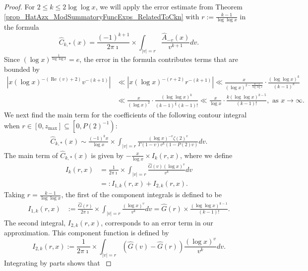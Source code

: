 \documentclass[11pt,reqno,a4letter]{article}
\numberwithin{figure}{section}
\numberwithin{table}{section}
\newcommand{\cf}{\textit{cf.\ }}
\theoremstyle{plain}
\numberwithin{theorem}{section}
\theoremstyle{definition}
\renewcommand{\Re}{\operatorname{Re}}
\begin{document}
\begin{proof}
For $2 \leq k \leq 2\log\log x$, we will apply the error estimate from 
Theorem \ref{prop_HatAzx_ModSummatoryFuncExps_RelatedToCkn} with 
$r := \frac{k-1}{\log\log x}$ in the formula 
\[
\widehat{C}_{k,\ast}(x) = \frac{(-1)^{k+1}}{2\pi\imath} \times \int_{|v|=r} 
     \frac{\widehat{A}_{-v}(x)}{v^{k+1}} dv. 
\]
Since $(\log x)^{\frac{1}{\log\log x}} = e$, the error in the formula 
contributes terms that are bounded by 
\begin{align*} 
\left\lvert x (\log x)^{-(\Re(v)+2)} v^{-(k+1)} \right\rvert & \ll 
     \left\lvert x (\log x)^{-(r+2)} r^{-(k+1)} \right\rvert 
     \ll \frac{x}{(\log x)^{2-\frac{k-1}{\log\log x}}} \cdot 
     \frac{(\log\log x)^{k}}{(k-1)^{k}} \\ 
     & \ll \frac{x}{(\log x)^2} \cdot \frac{(\log\log x)^{k}}{(k-1)^{\frac{1}{2}} (k-1)!} 
     \ll \frac{x}{\log x} \cdot \frac{k (\log\log x)^{k-5}}{(k-1)!}, 
     \text{ as } x \rightarrow \infty. 
\end{align*} 
We next find the main term for the coefficients 
of the following contour integral when 
$r \in [0, z_{\max}] \subseteq \left[0, P(2)^{-1}\right)$: 
\begin{align} 
\label{eqn_WideTildeArx_CountourIntDef_v1} 
\widehat{C}_{k,\ast}(x) \sim  
     \frac{(-1)^{k} x}{\log x} 
     \times \int_{|v|=r} \frac{(\log x)^{-v} \zeta(2)^{v}}{\Gamma(1 - v) 
     v^{k} (1 - P(2) v)} dv. 
\end{align} 
The main term of $\widehat{C}_{k,\ast}(x)$ 
is given by $-\frac{x}{\log x} \times I_k(r, x)$, where we define 
\begin{align*}
I_k(r, x) & = \frac{1}{2\pi\imath} \times \int_{|v|=r} 
     \frac{\widehat{G}(v) (\log x)^{v}}{v^k} dv \\ 
     & =: I_{1,k}(r, x) + I_{2,k}(r, x). 
\end{align*}
Taking $r = \frac{k-1}{\log\log x}$, the 
first of the component integrals is defined to be 
\begin{align*}
I_{1,k}(r, x) & := \frac{\widehat{G}(r)}{2\pi\imath} \times \int_{|v|=r} 
     \frac{(\log x)^{v}}{v^k} dv = \widehat{G}(r) \times \frac{(\log\log x)^{k-1}}{(k-1)!}. 
\end{align*}
The second integral, $I_{2,k}(r, x)$, corresponds to an error term in our approximation. 
This component function is defined by 
\[
I_{2,k}(r, x) := \frac{1}{2\pi\imath} \times \int_{|v|=r} 
     \left(\widehat{G}(v) - \widehat{G}(r)\right) 
     \frac{(\log x)^{v}}{v^k} dv. 
\]
Integrating by parts shows that \cite[\cf Thm.\ 7.19; \S 7.4]{MV} 

\end{proof}
\end{document}
